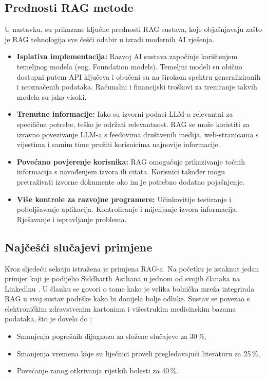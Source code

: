 \documentclass[]{foi}
\begin{document}
\subsection{Prednosti RAG metode}
U nastavku, su prikazane ključne prednosti RAG sustava, koje objašnjavaju zašto je RAG tehnologija sve češći odabir u izradi modernih AI rješenja. 

\begin{itemize}[noitemsep, topsep=0pt]
    \item \textbf{Isplativa implementacija:} Razvoj AI sustava započinje korištenjem temeljnog modela (eng. Foundation models). Temeljni modeli su obično dostupni putem API ključeva i obučeni su na širokom spektru generaliziranih i neoznačenih podataka. Računalni i financijski troškovi za treniranje takvih modela su jako visoki.

    \item \textbf{Trenutne informacije:} Iako su izvorni podaci LLM-a relevantni za specifične potrebe, teško je održati relevantnost. RAG se može koristiti za izravno povezivanje LLM-a s feedovima društvenih medija, web-stranicama s vijestima i samim time pružiti korisnicima najnovije informacije.

    \item \textbf{Povećano povjerenje korisnika:} RAG omogućuje prikazivanje točnih informacija s navođenjem izvora ili citata. Korisnici također mogu pretraživati izvorne dokumente ako im je potrebno dodatno pojašnjenje.

    \item \textbf{Više kontrole za razvojne programere:} Učinkovitije testiranje i poboljšavanje aplikacija. Kontroliranje i mijenjanje izvora informacija. Rješavanje i ispravljanje problema.
\end{itemize}
    
\subsection{Najčešći slučajevi primjene}
Kroz sljedeću sekciju istražena je primjena RAG-a. Na početku je istaknut jedan primjer koji je podijelio Siddharth Asthana u jednom od svojih
članaka na Linkedlnu \cite{siddharth2025rag}. U članku se govori o tome kako je velika bolnička mreža integrirala RAG u svoj sustav podrške kako bi donijela bolje odluke.
Sustav se povezao s elektroničkim zdravstvenim kartonima i višestrukim medicinskim bazama podataka, što je dovelo do \cite{siddharth2025rag}:
\begin{itemize}
    \item Smanjenja pogrešnih dijagnoza za složene slučajeve za 30\,\%,
    \item Smanjenja vremena koje su liječnici proveli pregledavajući literaturu za 25\,\%,
    \item Povećanje ranog otkrivanja rijetkih bolesti za 40\,\%.
\end{itemize}
\end{document}
